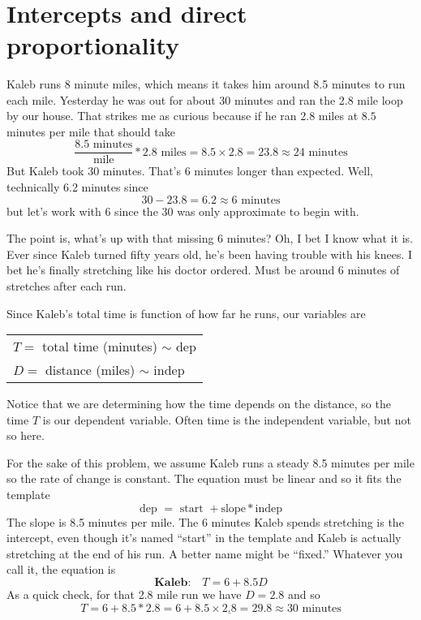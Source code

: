 ~\vspace{.1in}

\section{Intercepts and direct proportionality}

Kaleb runs 8 minute miles, which means it takes him around  8.5 minutes to run each mile.  Yesterday he was out for about 30 minutes and ran the 2.8 mile loop by our house.  That strikes me as curious because if he ran 2.8 miles at $8.5$ minutes per mile that should take 
$$ \frac{8.5 \text{ minutes}}{\text{mile}} \ast 2.8 \text{ miles} = 8.5 \times 2.8 = 23.8 \approx 24 \text{ minutes}$$
But Kaleb took 30 minutes.  That's 6 minutes longer than expected. Well, technically 6.2 minutes since $$30 - 23.8 = 6.2 \approx 6 \text{ minutes} $$ but let's work with 6 since the 30 was only approximate to begin with.

The point is, what's up with that missing 6 minutes?
Oh,  I bet I know what it is.  Ever since Kaleb turned fifty years old, he's been having trouble with his knees.  I bet he's finally stretching like his doctor ordered.  Must be around 6 minutes of stretches after each run.

Since Kaleb's total time is function of how far he runs, our variables are
\begin{center}
\begin{tabular} {l} 
$T=$ total time (minutes) $\sim$ dep \\ 
$D =$ distance (miles) $\sim$ indep \\
\end{tabular}
\end{center}
Notice that we are determining how the time depends on the distance, so the time $T$ is our dependent variable.  Often time is the independent variable, but not so here.  

For the sake of this problem, we assume Kaleb runs a steady 8.5 minutes per mile so the rate of change is constant.  The equation must be linear and so it fits the template
$$\text{dep }=\text{ start } + \text{slope} \ast {\text{indep}}$$
The slope is 8.5 minutes per mile.  The 6 minutes Kaleb spends stretching is the intercept, even though it's named ``start'' in the template and Kaleb is actually stretching at the end of his run.  A better name might be ``fixed.'' 
Whatever you call it, the equation is $$\textbf{Kaleb:}\quad  T = 6 + 8.5D$$
As a quick check, for that 2.8 mile run we have $D=2.8$ and so
$$T = 6 + 8.5 \ast 2.8 = 6 + 8.5 \times \underline{2.8} = 29.8 \approx 30 \text{ minutes}$$

